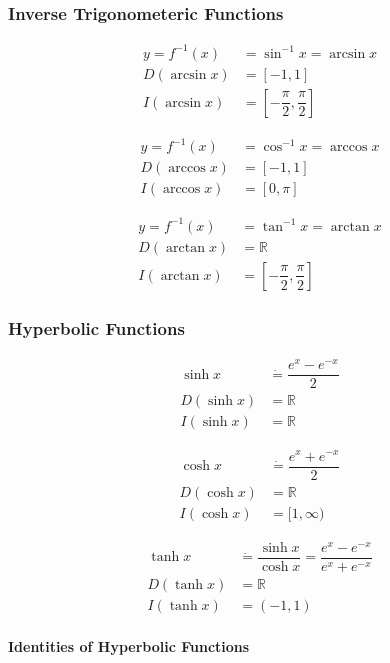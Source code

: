 \documentclass[fleqn]{article}
\begin{document}
\subsubsection{Inverse Trigonometeric Functions}

\begin{align}
	y = f^{-1}(x) &= \sin^{-1} x = \arcsin x \\
	D(\arcsin x) &= [-1,1] \\
	I(\arcsin x) &= [-\dfrac{\pi}{2}, \dfrac{\pi}{2}]
\end{align}

\begin{align}
	y = f^{-1}(x) &= \cos^{-1} x = \arccos x \\
	D(\arccos x) &= [-1,1] \\
	I(\arccos x) &= [0,\pi]
\end{align}

\begin{align}
y = f^{-1}(x) &= \tan^{-1} x = \arctan x \\
D(\arctan x) &= \mathbb{R} \\
I(\arctan x) &= [-\dfrac{\pi}{2}, \dfrac{\pi}{2}]
\end{align}

\subsubsection{Hyperbolic Functions}

\begin{align}
	\sinh x &\dot{=} \dfrac{e^x - e^{-x}}{2} \\
	D(\sinh x) &= \mathbb{R} \\
	I(\sinh x) &= \mathbb{R}
\end{align}

\begin{align}
	\cosh x &\dot{=} \dfrac{e^x + e^{-x}}{2} \\
	D(\cosh x) &= \mathbb{R} \\
	I(\cosh x) &= [1, \infty)
\end{align}

\begin{align}
	\tanh x &\dot{=} \dfrac{\sinh x}{\cosh x} = \dfrac{e^x - e^{-x}}{e^x + e^{-x}} \\
	D(\tanh x) &= \mathbb{R} \\
	I(\tanh x) &= (-1, 1)
\end{align}

\paragraph{Identities of Hyperbolic Functions \\}
\end{document}
